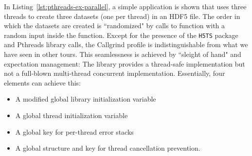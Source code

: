 






In Listing~\ref{lst:pthreads-ex-parallel}, a simple application is shown that uses three threads to create three datasets (one per thread) in an HDF5 file. The order in which the datasets are created is ``randomized" by calls to  function with a random input inside the  function. Except for the presence of the \texttt{H5TS} package and Pthreads library calls, the Callgrind profile is indistinguishable from what we have seen in other tours. This seamlessness is achieved by ``sleight of hand" and expectation management: The library provides a thread-safe implementation but not a full-blown multi-thread concurrent implementation. Essentially, four elements can achieve this:
\begin{itemize}
    \item A modified global library initialization variable
    \item A global thread initialization variable
    \item A global key for per-thread error stacks
    \item A global structure and key for thread cancellation prevention.
\end{itemize}

